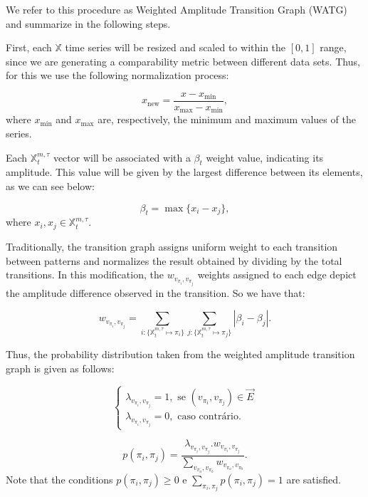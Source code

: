 \documentclass{isprs}
\begin{document}
We refer to this procedure as Weighted Amplitude Transition Graph (WATG) and summarize in the following steps.
	
First, each $\mathbb{X}$ time series will be resized and scaled to within the $[0, 1]$ range, since we are generating a comparability metric between different data sets.
Thus, for this we use the following normalization process:

\begin{equation}
	x_{\text{new}} = \frac{x - x_{\min}}{x_{\max} - x_{\min}},
\end{equation}
where $x_{\min}$ and $x_{\max}$ are, respectively, the minimum and maximum values of the series.
	
Each $\mathbb{X}^{m, \tau}_t$ vector will be associated with a $\beta_t$ weight value, indicating its amplitude.
This value will be given by the largest difference between its elements, as we can see below:

\begin{equation}
	\beta_t = \max\{x_i - x_j\},
\end{equation}
where $x_i, x_j \in \mathbb{X}^{m, \tau}_t$.
	
Traditionally, the transition graph assigns uniform weight to each transition between patterns and normalizes the result obtained by dividing by the total transitions.
In this modification, the $w_{v_{\pi_i}, v_{\pi_j}}$ weights assigned to each edge depict the amplitude difference observed in the transition.
So we have that:	

\begin{equation}
	w_{v_{\pi_i}, v_{\pi_j}} =  \sum_{i : \{\mathbb{X}^{m,\tau}_t \mapsto \pi_i\}} \sum_{j : \{\mathbb{X}^{m,\tau}_t \mapsto \pi_j\}} |\beta_i - \beta_j| .
\end{equation}
	
Thus, the probability distribution taken from the weighted amplitude transition graph is given as follows:	

\begin{equation}
	\left\{\begin{array}{l}
	\lambda_{v_{\pi_i}, v_{\pi_j}} = 1, \text{ se } (v_{\pi_i}, v_{\pi_j}) \in \vec{E} \\
	\lambda_{v_{\pi_i}, v_{\pi_j}} = 0, \text{ caso contrário}.
	\end{array}\right.
\end{equation}
	
\begin{equation}
	p(\pi_i, \pi_j) = \frac{\lambda_{v_{\pi_i}, v_{\pi_j}} . w_{v_{\pi_i}, v_{\pi_j}}}{\sum_{v_{\pi_a}, v_{\pi_b}} w_{v_{\pi_a}, v_{\pi_b}}}.
\end{equation}	
Note that the conditions $p(\pi_i, \pi_j) \ge 0$ e $\sum_{\pi_i, \pi_j} p(\pi_i, \pi_j) = 1$ are satisfied.
	
\end{document}
